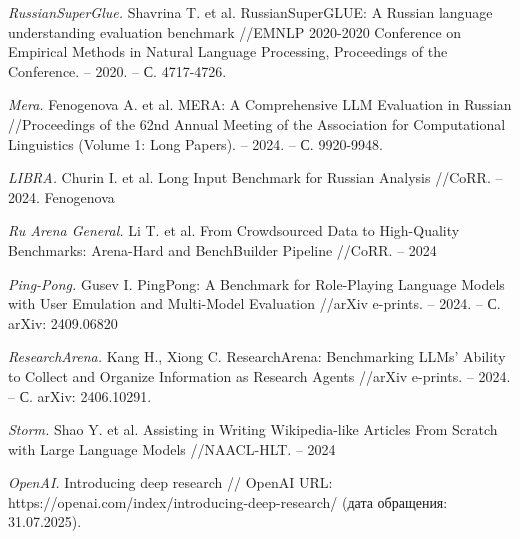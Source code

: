 \documentclass{article}
\theoremstyle{definition}
\theoremstyle{plain}
\begin{document}
\begin{thebibliography}{99}

\textit{RussianSuperGlue.}
Shavrina T. et al. RussianSuperGLUE: A Russian language understanding evaluation benchmark //EMNLP 2020-2020 Conference on Empirical Methods in Natural Language Processing, Proceedings of the Conference. – 2020. – С. 4717-4726.

\textit{Mera.}
Fenogenova A. et al. MERA: A Comprehensive LLM Evaluation in Russian //Proceedings of the 62nd Annual Meeting of the Association for Computational Linguistics (Volume 1: Long Papers). – 2024. – С. 9920-9948.

\textit{LIBRA.}
Churin I. et al. Long Input Benchmark for Russian Analysis //CoRR. – 2024. Fenogenova 

\textit{Ru Arena General.}
Li T. et al. From Crowdsourced Data to High-Quality Benchmarks: Arena-Hard and BenchBuilder Pipeline //CoRR. – 2024

\textit{Ping-Pong.}
Gusev I. PingPong: A Benchmark for Role-Playing Language Models with User Emulation and Multi-Model Evaluation //arXiv e-prints. – 2024. – С. arXiv: 2409.06820

\textit{ResearchArena.}
Kang H., Xiong C. ResearchArena: Benchmarking LLMs' Ability to Collect and Organize Information as Research Agents //arXiv e-prints. – 2024. – С. arXiv: 2406.10291.

\textit{Storm.}
Shao Y. et al. Assisting in Writing Wikipedia-like Articles From Scratch with Large Language Models //NAACL-HLT. – 2024

\textit{OpenAI.}
Introducing deep research // OpenAI URL: https://openai.com/index/introducing-deep-research/ (дата обращения: 31.07.2025).

\end{thebibliography}
\end{document}
